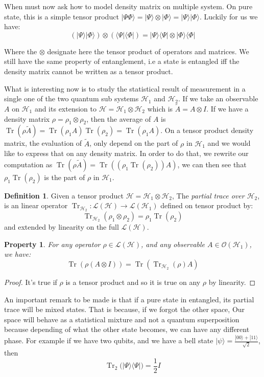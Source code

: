 \documentclass[10pt]{report}
\theoremstyle{plain}
\newtheorem{prop}[thm]{Property}
\theoremstyle{definition}
\newtheorem{defn}{Definition}[chapter]
\theoremstyle{remark}
\newcommand{\ket}[1]{|#1\rangle}
\newcommand{\bra}[1]{\langle#1|}
\DeclareMathOperator{\Tr}{Tr}
\begin{document}
When must now ask how to model density matrix on multiple system. On pure state,
this is a simple tensor product $\ket{\Psi\Phi} = \ket \Psi \otimes \ket \Phi =
\ket \Psi\ket\Phi$. Luckily for us we have:
\[(\ket\Psi\ket\Phi) \otimes (\bra\Psi\bra\Phi) = \ket\Psi\bra\Psi \otimes \ket
  \Phi \bra \Phi\]

Where the $\otimes$ designate here the tensor product of operators and matrices.
We still have the same property of entanglement, i.e a state is entangled iff
the density matrix cannot be written as a tensor product.

What is interesting now is to study the statistical result of measurement in a
single one of the two quantum sub systems $\mathcal{H}_1$ and $\mathcal{H}_2$.
If we take an observable $A$ on $\mathcal{H}_1$ and its extension to
$\mathcal{H} = \mathcal{H}_1 \otimes \mathcal{H}_2$ which is $\tilde A = A
\otimes I$. If we have a density matrix $\rho = \rho_1 \otimes \rho_2$, then the
average of $A$ is $\Tr(\rho \tilde A) = \Tr(\rho_1A)\Tr(\rho_2) = \Tr(\rho_1A)$.
On a tensor product density matrix, the evaluation of $\tilde A$, only depend on
the part of $\rho$ in $\mathcal{H}_1$ and we would like to express that on any
density matrix. In order to do that, we rewrite our computation as
$\Tr(\rho\tilde A) = \Tr((\rho_1\Tr(\rho_2))A)$, we can then see that
$\rho_1\Tr(\rho_2)$ is the part of $\rho$ in $\mathcal{H}_1$.

\begin{defn}
  Given a tensor product $\mathcal{H} = \mathcal{H}_1 \otimes \mathcal{H}_2$,
  The \emph{partial trace over $\mathcal{H}_2$}, is an linear operator
  $\Tr_{\mathcal{H}_2} : \mathcal{L}(\mathcal{H}) \to
  \mathcal{L}(\mathcal{H}_1)$ defined on tensor product by:
  \[\Tr_{\mathcal{H}_2}(\rho_1\otimes \rho_2) = \rho_1 \Tr(\rho_2)\]
  and extended by linearity on the full $\mathcal{L}(\mathcal{H})$.
\end{defn}

\begin{prop}
  For any operator $\rho \in \mathcal{L}(\mathcal{H})$, and any observable
  $A\in\mathcal{O}(\mathcal{H}_1)$, we have:
  \[\Tr(\rho(A \otimes I)) = \Tr(\Tr_{\mathcal{H}_2}(\rho)A)\]
\end{prop}

\begin{proof}
  It's true if $\rho$ is a tensor product and so it is true on any $\rho$ by linearity.
\end{proof}

An important remark to be made is that if a pure state in entangled, its partial
trace will be mixed states. That is because, if we forgot the other space, Our
space will behave as a statistical mixture and not a quantum superposition
because depending of what the other state becomes, we can have any different phase.
For example if we have two qubits, and we have a
bell state $\ket \psi = \frac{\ket{00} + \ket{11}}{\sqrt 2}$, then
\[\Tr_2\big(\ket \Psi \bra \Psi\big) = \frac 12I\]
\end{document}
